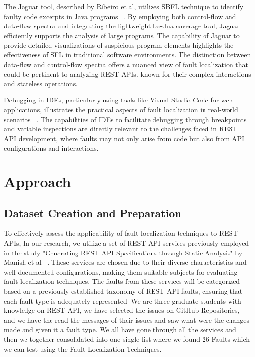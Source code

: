 \documentclass[conference]{IEEEtran}
\begin{document}
The Jaguar tool, described by Ribeiro et al, utilizes SBFL technique to identify faulty code excerpts in Java programs ~\cite{8367068}. By employing both control-flow and data-flow spectra and integrating the lightweight ba-dua coverage tool, Jaguar efficiently supports the analysis of large programs. The capability of Jaguar to provide detailed visualizations of suspicious program elements highlights the effectiveness of SFL in traditional software environments. The distinction between data-flow and control-flow spectra offers a nuanced view of fault localization that could be pertinent to analyzing REST APIs, known for their complex interactions and stateless operations.

Debugging in IDEs, particularly using tools like Visual Studio Code for web applications, illustrates the practical aspects of fault localization in real-world scenarios ~\cite{DebuggingCode}. The capabilities of IDEs to facilitate debugging through breakpoints and variable inspections are directly relevant to the challenges faced in REST API development, where faults may not only arise from code but also from API configurations and interactions.

\section{Approach}
\label{sec:approach}

\subsection{Dataset Creation and Preparation}

To effectively assess the applicability of fault localization techniques to REST APIs, In our research, we utilize a set of REST API services previously employed in the study "Generating REST API Specifications through Static Analysis" by Manish et al ~\cite{ManishRestServices}. These services are chosen due to their diverse characteristics and well-documented configurations, making them suitable subjects for evaluating fault localization techniques. 
The faults from these services will be categorized based on a previously established taxonomy of REST API faults, ensuring that each fault type is adequately represented. We are three graduate students with knowledge on REST API, we have selected the issues on GitHub Repositories, and we have the read the messages of their issues and saw what were the changes made and given it a fault type. We all have gone through all the services and then we together consolidated into one single list where we found 26 Faults which we can test using the Fault Localization Techniques. 
\end{document}
